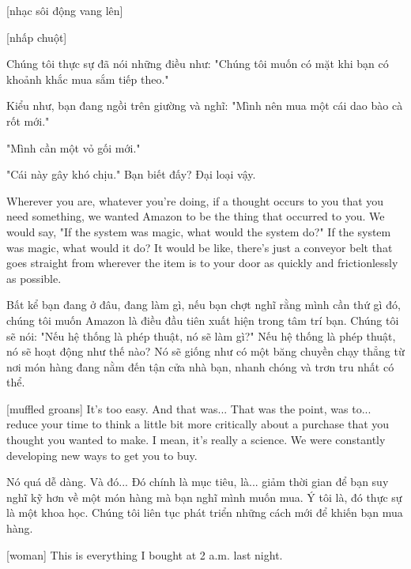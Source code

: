 \documentclass[a4paper]{article}
\begin{document}
	\begin{vietnamese-v2}
		
		[nhạc sôi động vang lên] 
		
		[nhấp chuột] 
		
		Chúng tôi thực sự đã nói những điều như: "Chúng tôi muốn có mặt khi bạn có khoảnh khắc mua sắm tiếp theo." 
		
		Kiểu như, bạn đang ngồi trên giường và nghĩ: "Mình nên mua một cái dao bào cà rốt mới." 
		
		"Mình cần một vỏ gối mới." 
		
		"Cái này gây khó chịu." Bạn biết đấy? Đại loại vậy.
	\end{vietnamese-v2}
	
	Wherever you are, whatever you're doing, if a thought occurs to you that you need something, we wanted Amazon to be the thing that occurred to you.
	We would say, "If the system was magic, what would the system do?"
	If the system was magic, what would it do? It would be like, there's just a conveyor belt that goes straight from wherever the item is to your door as quickly and frictionlessly as possible.
	
	
	\begin{vietnamese-v2}
		Bất kể bạn đang ở đâu, đang làm gì, nếu bạn chợt nghĩ rằng mình cần thứ gì đó, chúng tôi muốn Amazon là điều đầu tiên xuất hiện trong tâm trí bạn. Chúng tôi sẽ nói: "Nếu hệ thống là phép thuật, nó sẽ làm gì?" 
		Nếu hệ thống là phép thuật, nó sẽ hoạt động như thế nào? Nó sẽ giống như có một băng chuyền chạy thẳng từ nơi món hàng đang nằm đến tận cửa nhà bạn, nhanh chóng và trơn tru nhất có thể.
	\end{vietnamese-v2}
	
	[muffled groans]
	It's too easy. And that was... That was the point, was to... reduce your time to think a little bit more critically about a purchase that you thought you wanted to make.
	I mean, it's really a science.
	We were constantly developing new ways to get you to buy.
	
	
	\begin{vietnamese-v2}
		Nó quá dễ dàng. Và đó... Đó chính là mục tiêu, là... giảm thời gian để bạn suy nghĩ kỹ hơn về một món hàng mà bạn nghĩ mình muốn mua. 
		Ý tôi là, đó thực sự là một khoa học. 
		Chúng tôi liên tục phát triển những cách mới để khiến bạn mua hàng.
	\end{vietnamese-v2}
	
	[woman] This is everything I bought at 2 a.m. last night.
	
\end{document}
